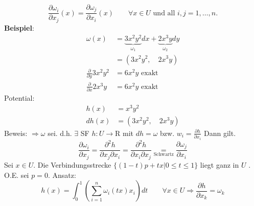 \documentclass[ngerman]{tudscrreprt}
\begin{document}
\begin{equation*}
\frac{\partial \omega_i}{\partial x_j}(x) = \frac{\partial \omega_j}{\partial x_i}(x) \qquad \forall x\in U \text{ und all } i,j =1,\dots, n.
\end{equation*}
\textbf{Beispiel}: \begin{equation*}
\begin{split}
\omega (x) &= \underbrace{3x^2y^2}_{\omega_1}dx +\underbrace{2x^3 y}_{\omega_2}dy \\ 
&=(3x^2y^2, \quad 2x^3 y)\\ 
\frac{\partial}{\partial y}3x^2y^2 &=6x^2y \text{  exakt } \\ 
\frac{\partial}{\partial x}2x^3 y&= 6x^2y \text{  exakt}
\end{split}
\end{equation*}
Potential: 
\begin{equation*}
\begin{split}
h(x)&= x^3 y^2 \\ 
dh(x)&=(3x^2y^2, \quad 2x^3 y)
\end{split}
\end{equation*}
Beweis: $\Rightarrow \omega$ sei. d.h. $\exists$ SF $h: U\to \mathrm{R}$ mit $dh = \omega$ bzw. $w_i = \frac{\partial h}{\partial x_i}$ 
Dann gilt. \begin{equation*}
\frac{\partial \omega_i}{\partial x_j} = \frac{\partial^2h}{\partial x_j \partial x_i} = \frac{\partial^2h}{\partial x_i \partial x_j} \underset{\text{Schwartz}}{=} \frac{\partial \omega_j}{\partial x_i}
\end{equation*}
Sei $x\in U$. Die Verbindungsstrecke $\{ (1-t)p + tx | 0\le t\le 1  \}$ liegt ganz in $U$ . O.E. sei $p=0$. Ansatz: 
\begin{equation*}
h(x) = \int_0^1 (\sum_{i=1}^n \omega_i (tx)x_i )dt \qquad \forall x \in U \Rightarrow \frac{\partial h}{\partial x_{k}} = \omega_k
\end{equation*}
\end{document}
